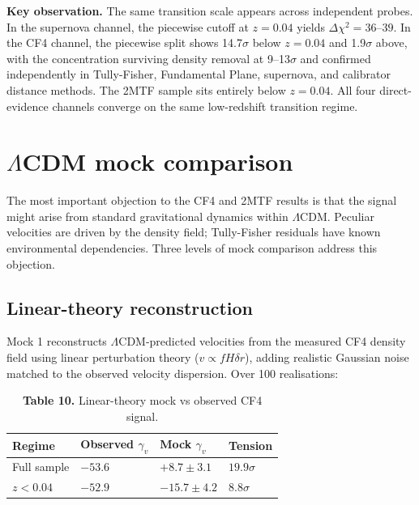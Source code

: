 \documentclass[11pt,a4paper]{article}
\begin{document}
\begin{mdframed}[linecolor=accent,linewidth=0.5pt,backgroundcolor=callout-bg,leftline=true,rightline=true,topline=true,bottomline=true,innerleftmargin=8pt,innerrightmargin=8pt,innertopmargin=6pt,innerbottommargin=6pt]
\textbf{Key observation.} The same transition scale appears across independent probes. In the supernova channel, the piecewise cutoff at \(z = 0.04\) yields \(\Delta\chi^2 = 36\text{--}39\). In the CF4 channel, the piecewise split shows 14.7\(\sigma\) below \(z = 0.04\) and 1.9\(\sigma\) above, with the concentration surviving density removal at 9--13\(\sigma\) and confirmed independently in Tully-Fisher, Fundamental Plane, supernova, and calibrator distance methods. The 2MTF sample sits entirely below \(z = 0.04\). All four direct-evidence channels converge on the same low-redshift transition regime.
\end{mdframed}

\section{\(\Lambda\)CDM mock comparison}
\label{sec:sec7}
The most important objection to the CF4 and 2MTF results is that the signal might arise from standard gravitational dynamics within \(\Lambda\)CDM. Peculiar velocities are driven by the density field; Tully-Fisher residuals have known environmental dependencies. Three levels of mock comparison address this objection.

\subsection{Linear-theory reconstruction}
Mock 1 reconstructs \(\Lambda\)CDM-predicted velocities from the measured CF4 density field using linear perturbation theory (\(v \propto f H \delta r\)), adding realistic Gaussian noise matched to the observed velocity dispersion. Over 100 realisations:

\begin{table}[H]
\centering
\footnotesize
\caption{\textbf{Table 10.} Linear-theory mock vs observed CF4 signal.}
\begin{tabularx}{\linewidth}{l>{\RaggedRight\arraybackslash}X>{\RaggedRight\arraybackslash}X>{\RaggedRight\arraybackslash}X}
\toprule
\textbf{Regime} & \textbf{Observed \(\gamma_v\)} & \textbf{Mock \(\gamma_v\)} & \textbf{Tension} \tabularnewline
\midrule
Full sample & \(-53.6\) & \(+8.7 \pm 3.1\) & \(19.9\sigma\) \tabularnewline
\(z < 0.04\) & \(-52.9\) & \(-15.7 \pm 4.2\) & \(8.8\sigma\) \tabularnewline
\bottomrule
\end{tabularx}
\end{table}
\end{document}
